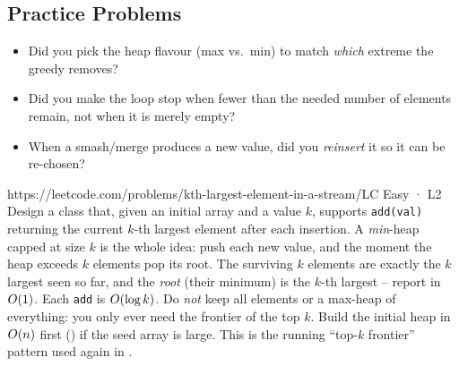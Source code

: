 \subsection{Practice Problems}

\begin{stuckbox}
\begin{itemize}[nosep, leftmargin=1.4em]
  \item Did you pick the heap flavour (max vs.\ min) to match \emph{which} extreme the greedy removes?
  \item Did you make the loop stop when fewer than the needed number of elements remain, not when it is
        merely empty?
  \item When a smash/merge produces a new value, did you \emph{reinsert} it so it can be re-chosen?
\end{itemize}
\end{stuckbox}

\begin{practiceset}
    {https://leetcode.com/problems/kth-largest-element-in-a-stream/}{LC Easy · L2}
    {Design a class that, given an initial array and a value $k$, supports \texttt{add(val)} returning the
    current $k$-th largest element after each insertion. A \emph{min}-heap capped at size $k$ is the whole
    idea: push each new value, and the moment the heap exceeds $k$ elements pop its root. The surviving
    $k$ elements are exactly the $k$ largest seen so far, and the \emph{root} (their minimum) is the
    $k$-th largest -- report  in $O(1)$. Each \texttt{add} is $O(\log k)$. Do
    \emph{not} keep all elements or a max-heap of everything: you only ever need the frontier of the top
    $k$. Build the initial heap in $O(n)$ first () if the seed array is large. This
    is the running ``top-$k$ frontier'' pattern used again in .}
\end{practiceset}

